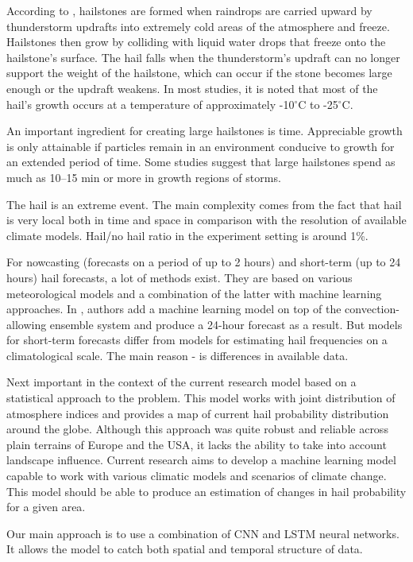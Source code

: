 \documentclass[conference]{IEEEtran}
\begin{document}
According to \cite{hailform}, hailstones are formed when raindrops are carried upward by thunderstorm updrafts into extremely cold areas of the atmosphere and freeze. Hailstones then grow by colliding with liquid water drops that freeze onto the hailstone’s surface. The hail falls when the thunderstorm's updraft can no longer support the weight of the hailstone, which can occur if the stone becomes large enough or the updraft weakens. In most studies, it is noted that most of the hail's growth occurs at a temperature of approximately -10$^{\circ}$C to -25$^{\circ}$C.

An important ingredient for creating large hailstones is time. Appreciable growth is only attainable if particles remain in an environment conducive to growth for an extended period of time. Some studies suggest that large hailstones spend as much as 10–15 min or more in growth regions of storms.

The hail is an extreme event. The main complexity comes from the fact that hail is very local both in time and space in comparison with the resolution of available climate models. Hail/no hail ratio in the experiment setting is around 1\%. 

For nowcasting (forecasts on a period of up to 2 hours) and short-term (up to 24 hours) hail forecasts, a lot of methods exist.  They are based on various meteorological models and a combination of the latter with machine learning approaches. In \cite{burke2020calibration}, authors add a machine learning model on top of the convection-allowing ensemble system and produce a 24-hour forecast as a result. But models for short-term forecasts differ from models for estimating hail frequencies on a climatological scale. The main reason - is differences in available data. 

Next important in the context of the current research model \cite{PREIN201810} based on a statistical approach to the problem. This model works with joint distribution of atmosphere indices and provides a map of current hail probability distribution around the globe. Although this approach was quite robust and reliable across plain terrains of Europe and the USA, it lacks the ability to take into account landscape influence.  Current research aims to develop a machine learning model capable to work with various climatic models and scenarios of climate change. This model should be able to produce an estimation of changes in hail probability for a given area.   

Our main approach is to use a combination of CNN and LSTM neural networks. It allows the model to catch both spatial and temporal structure of data. 
\end{document}
